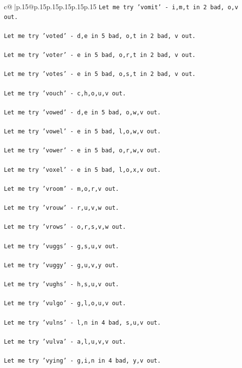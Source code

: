 \documentclass{article}
\begin{document}
{\begin{supertabular}{c@{$\;$}|p{.15\linewidth}@{}p{.15\linewidth}p{.15\linewidth}p{.15\linewidth}p{.15\linewidth}p{.15\linewidth}}
{{{\texttt{Let me try 'vomit' {-} i,m,t in 2 bad, o,v out. } \\
\\ 
\texttt{Let me try 'voted' {-} d,e in 5 bad, o,t in 2 bad, v out. } \\
\\ 
\texttt{Let me try 'voter' {-} e in 5 bad, o,r,t in 2 bad, v out. } \\
\\ 
\texttt{Let me try 'votes' {-} e in 5 bad, o,s,t in 2 bad, v out. } \\
\\ 
\texttt{Let me try 'vouch' {-} c,h,o,u,v out. } \\
\\ 
\texttt{Let me try 'vowed' {-} d,e in 5 bad, o,w,v out. } \\
\\ 
\texttt{Let me try 'vowel' {-} e in 5 bad, l,o,w,v out. } \\
\\ 
\texttt{Let me try 'vower' {-} e in 5 bad, o,r,w,v out. } \\
\\ 
\texttt{Let me try 'voxel' {-} e in 5 bad, l,o,x,v out. } \\
\\ 
\texttt{Let me try 'vroom' {-} m,o,r,v out. } \\
\\ 
\texttt{Let me try 'vrouw' {-} r,u,v,w out. } \\
\\ 
\texttt{Let me try 'vrows' {-} o,r,s,v,w out. } \\
\\ 
\texttt{Let me try 'vuggs' {-} g,s,u,v out. } \\
\\ 
\texttt{Let me try 'vuggy' {-} g,u,v,y out. } \\
\\ 
\texttt{Let me try 'vughs' {-} h,s,u,v out. } \\
\\ 
\texttt{Let me try 'vulgo' {-} g,l,o,u,v out. } \\
\\ 
\texttt{Let me try 'vulns' {-} l,n in 4 bad, s,u,v out. } \\
\\ 
\texttt{Let me try 'vulva' {-} a,l,u,v,v out. } \\
\\ 
\texttt{Let me try 'vying' {-} g,i,n in 4 bad, y,v out. } \\
}}}
\end{supertabular}}
\end{document}
